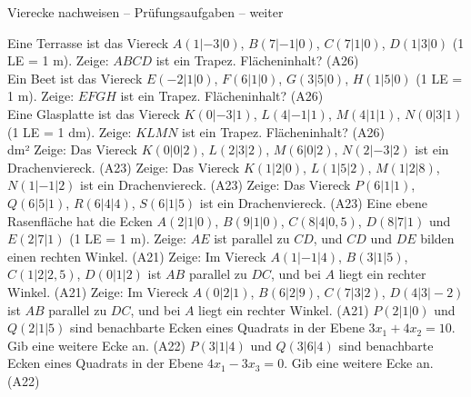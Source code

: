 \begin{aufgabe}{Vierecke nachweisen – Prüfungsaufgaben – weiter}
\begin{teile}
\teil Eine Terrasse ist das Viereck $A(1 | -3 | 0)$, $B(7 | -1 | 0)$, $C(7 | 1 | 0)$, $D(1 | 3 | 0)$ (1 LE = 1 m). Zeige: $ABCD$ ist ein Trapez. Flächeninhalt? \hfill (A26) \\ \leerfeld[m²]
\teil Ein Beet ist das Viereck $E(-2 | 1 | 0)$, $F(6 | 1 | 0)$, $G(3 | 5 | 0)$, $H(1 | 5 | 0)$ (1 LE = 1 m). Zeige: $EFGH$ ist ein Trapez. Flächeninhalt? \hfill (A26) \\ \leerfeld[m²]
\teil Eine Glasplatte ist das Viereck $K(0 | -3 | 1)$, $L(4 | -1 | 1)$, $M(4 | 1 | 1)$, $N(0 | 3 | 1)$ (1 LE = 1 dm). Zeige: $KLMN$ ist ein Trapez. Flächeninhalt? \hfill (A26) \\ \leerfeld dm²
\teil Zeige: Das Viereck $K(0 | 0 | 2)$, $L(2 | 3 | 2)$, $M(6 | 0 | 2)$, $N(2 | -3 | 2)$ ist ein Drachenviereck. \hfill (A23)
\teil Zeige: Das Viereck $K(1 | 2 | 0)$, $L(1 | 5 | 2)$, $M(1 | 2 | 8)$, $N(1 | -1 | 2)$ ist ein Drachenviereck. \hfill (A23)
\teil Zeige: Das Viereck $P(6 | 1 | 1)$, $Q(6 | 5 | 1)$, $R(6 | 4 | 4)$, $S(6 | 1 | 5)$ ist ein Drachenviereck. \hfill (A23)
\teil Eine ebene Rasenfläche hat die Ecken $A(2 | 1 | 0)$, $B(9 | 1 | 0)$, $C(8 | 4 | 0{,}5)$, $D(8 | 7 | 1)$ und $E(2 | 7 | 1)$ (1 LE = 1 m). Zeige: $AE$ ist parallel zu $CD$, und $CD$ und $DE$ bilden einen rechten Winkel. \hfill (A21)
\teil Zeige: Im Viereck $A(1 | -1 | 4)$, $B(3 | 1 | 5)$, $C(1 | 2 | 2{,}5)$, $D(0 | 1 | 2)$ ist $AB$ parallel zu $DC$, und bei $A$ liegt ein rechter Winkel. \hfill (A21)
\teil Zeige: Im Viereck $A(0 | 2 | 1)$, $B(6 | 2 | 9)$, $C(7 | 3 | 2)$, $D(4 | 3 | -2)$ ist $AB$ parallel zu $DC$, und bei $A$ liegt ein rechter Winkel. \hfill (A21)
\teil $P(2 | 1 | 0)$ und $Q(2 | 1 | 5)$ sind benachbarte Ecken eines Quadrats in der Ebene $3x_1 + 4x_2 = 10$. Gib eine weitere Ecke an. \hfill (A22)
\teil $P(3 | 1 | 4)$ und $Q(3 | 6 | 4)$ sind benachbarte Ecken eines Quadrats in der Ebene $4x_1 - 3x_3 = 0$. Gib eine weitere Ecke an. \hfill (A22)
\end{teile}
\end{aufgabe}

